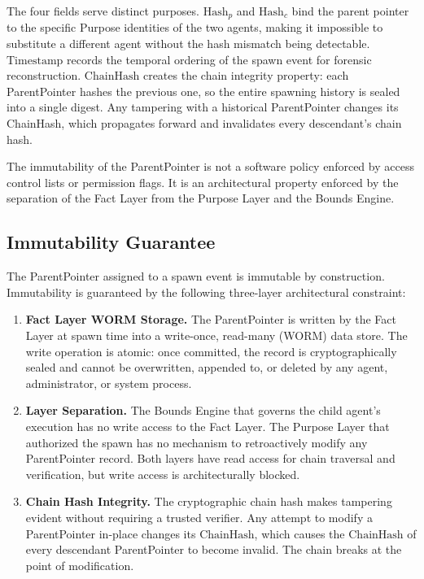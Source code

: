 The four fields serve distinct purposes. $\mathrm{Hash}_p$ and $\mathrm{Hash}_c$ bind the parent pointer to the specific Purpose identities of the two agents, making it impossible to substitute a different agent without the hash mismatch being detectable. $\mathrm{Timestamp}$ records the temporal ordering of the spawn event for forensic reconstruction. $\mathrm{ChainHash}$ creates the chain integrity property: each ParentPointer hashes the previous one, so the entire spawning history is sealed into a single digest. Any tampering with a historical ParentPointer changes its ChainHash, which propagates forward and invalidates every descendant's chain hash.

The immutability of the ParentPointer is not a software policy enforced by access control lists or permission flags. It is an architectural property enforced by the separation of the Fact Layer from the Purpose Layer and the Bounds Engine.

\subsection{Immutability Guarantee}

\begin{definition}
\label{def:immutability}
The ParentPointer assigned to a spawn event is immutable by construction. Immutability is guaranteed by the following three-layer architectural constraint:

\begin{enumerate}
  \item \textbf{Fact Layer WORM Storage.} The ParentPointer is written by the Fact Layer at spawn time into a write-once, read-many (WORM) data store. The write operation is atomic: once committed, the record is cryptographically sealed and cannot be overwritten, appended to, or deleted by any agent, administrator, or system process.

  \item \textbf{Layer Separation.} The Bounds Engine that governs the child agent's execution has no write access to the Fact Layer. The Purpose Layer that authorized the spawn has no mechanism to retroactively modify any ParentPointer record. Both layers have read access for chain traversal and verification, but write access is architecturally blocked.

  \item \textbf{Chain Hash Integrity.} The cryptographic chain hash makes tampering evident without requiring a trusted verifier. Any attempt to modify a ParentPointer in-place changes its $\mathrm{ChainHash}$, which causes the $\mathrm{ChainHash}$ of every descendant ParentPointer to become invalid. The chain breaks at the point of modification.
\end{enumerate}
\end{definition}

